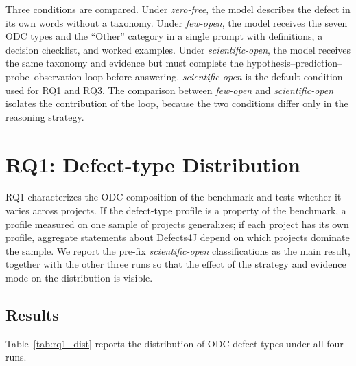 \documentclass{iutbscthesis}
\begin{document}
Three conditions are compared. Under \textit{zero-free}, the model describes the defect in its own words without a taxonomy. Under \textit{few-open}, the model receives the seven ODC types and the ``Other'' category in a single prompt with definitions, a decision checklist, and worked examples. Under \textit{scientific-open}, the model receives the same taxonomy and evidence but must complete the hypothesis--prediction--probe--observation loop before answering. \textit{scientific-open} is the default condition used for RQ1 and RQ3. The comparison between \textit{few-open} and \textit{scientific-open} isolates the contribution of the loop, because the two conditions differ only in the reasoning strategy.

\section{RQ1: Defect-type Distribution}
\label{sec:rq1}

RQ1 characterizes the ODC composition of the benchmark and tests whether it varies across projects. If the defect-type profile is a property of the benchmark, a profile measured on one sample of projects generalizes; if each project has its own profile, aggregate statements about Defects4J depend on which projects dominate the sample. We report the pre-fix \textit{scientific-open} classifications as the main result, together with the other three runs so that the effect of the strategy and evidence mode on the distribution is visible.

\subsection{Results}

Table~\ref{tab:rq1_dist} reports the distribution of ODC defect types under all four runs.
\end{document}
